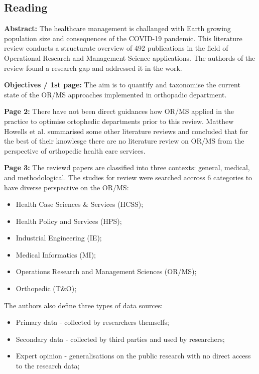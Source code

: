 \subsection{Reading}

    \textbf{Abstract:}
    The healthcare management is challanged with Earth growing population size and consequences of the COVID-19 pandemic. This literature review conducts a structurate overview of 492 publications in the field of Operational Research and Management Science applications. The authords of the review found a research gap and addressed it in the work.
    
    \textbf{Objectives / 1st page:}
    The aim is to quantify and taxonomise the current state of the OR/MS approaches implemented in orthopadic department.
    
    \textbf{Page 2:}
    There have not been direct guidances how OR/MS applied in the practice to optimise ortophedic departments prior to this review. Matthew Howells et al. \cite{x122} summarised some other literature reviews and concluded that for the best of their knowlesge there are no literature review on OR/MS from the perspective of orthopedic health care services.
    
    \textbf{Page 3:}
    The reviewd papers are classified into three contexts: general, medical, and methodological. The studies for review were searched accross 6 categories to have diverse perspective on the OR/MS:

    \begin{itemize}
        \item Health Case Sciences \& Services (HCSS);
        \item Health Policy and Services (HPS);
        \item Industrial Engineering (IE);
        \item Medical Informatics (MI);
        \item Operations Research and Management Sciences (OR/MS);
        \item Orthopedic (T\&O);
    \end{itemize}

    The authors also define three types of data sources:

    \begin{itemize}
        \item Primary data - collected by researchers themselfs;
        \item Secondary data - collected by third parties and used by researchers;
        \item Expert opinion - generalisations on the public research with no direct access to the research data;
    \end{itemize}

